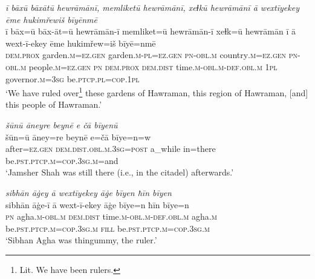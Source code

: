 \ea \label{DP.21}
\textit{ī bāxū bāxātū hewrāmānī, memliketū hewrāmānī, xeɫkū hewrāmānī ā wextīyekey ēme hukimřewiš bīyēnmē} \\ 
\gll ī bāx=ū bāx-āt=ū hewrāmān-ī memliket=ū hewrāmān-ī xeɫk=ū hewrāmān ī ā wext-ī-ekey ēme hukimřew=iš bīyē=nmē \\ 
 \textsc{dem.prox} garden\textsc{.m}\textsc{=ez}\textsc{.gen} garden\textsc{.m}\textsc{-pl}\textsc{=ez}\textsc{.gen} \textsc{pn}\textsc{-obl}\textsc{.m} country\textsc{.m}\textsc{=ez}\textsc{.gen} \textsc{pn}\textsc{-obl}\textsc{.m} people\textsc{.m}\textsc{=ez}\textsc{.gen} \textsc{pn} \textsc{dem.prox} \textsc{dem.dist} time\textsc{.m}\textsc{-obl}\textsc{.m}\textsc{-def}\textsc{.obl}\textsc{.m} \textsc{1pl} governor\textsc{.m}\textsc{=3sg} be\textsc{.ptcp}\textsc{.pl}\textsc{=cop}\textsc{.1pl} \\ 
\glt `We have ruled over\footnote{Lit. We have been rulers.} these gardens of Hawraman, this region of Hawraman, [and] this people of Hawraman.'
\z 
 
\ea \label{DP.25}
\textit{šūnū āneyre beynē e čā bīyenū} \\ 
\gll šūn=ū āney=re beynē e=čā bīye=n=w \\ 
 after\textsc{=ez}\textsc{.gen} \textsc{dem.dist}\textsc{.obl}\textsc{.m}\textsc{.3sg}\textsc{=\textsc{post}} a\_while in=there be\textsc{.pst}\textsc{.ptcp}\textsc{.m}\textsc{=cop}\textsc{.3sg}\textsc{.m}=and \\ 
\glt `Jamsher Shah was still there (i.e., in the citadel) afterwards.'
\z 
 
\ea \label{DP.26}
\textit{sibhān āġey ā wextīyekey āġe bīyen ħīn bīyen} \\ 
\gll sibhān āġe-ī ā wext-ī-ekey āġe bīye=n ħīn bīye=n \\ 
 \textsc{pn} agha\textsc{.m}\textsc{-obl}\textsc{.m} \textsc{dem.dist} time\textsc{.m}\textsc{-obl}\textsc{.m}\textsc{-def}\textsc{.obl}\textsc{.m} agha\textsc{.m} be\textsc{.pst}\textsc{.ptcp}\textsc{.m}\textsc{=cop}\textsc{.3sg}\textsc{.m} \textsc{fill} be\textsc{.pst}\textsc{.ptcp}\textsc{.m}\textsc{=cop}\textsc{.3sg}\textsc{.m} \\ 
\glt `Sibhan Agha was thingummy, the ruler.'
\z 
 
